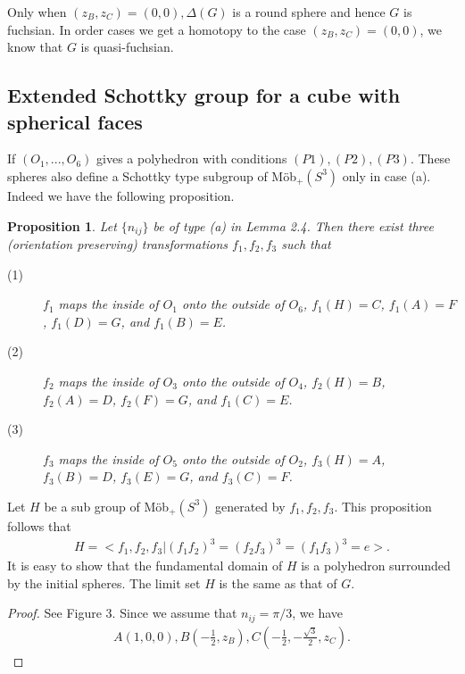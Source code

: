 \documentclass[dvipdfmx]{interact}
\theoremstyle{plain}%
\newtheorem{proposition}[theorem]{Proposition}
\theoremstyle{definition}
\theoremstyle{remark}
\theoremstyle{problemstyle}
\begin{document}
Only when $(z_B, z_C) =(0, 0), \Delta(G)$ is a round sphere and hence
$G$ is fuchsian. In order cases we get a homotopy to the case 
$(z_B, z_C) = (0, 0)$, we know that $G$ is quasi-fuchsian.

\subsection{Extended Schottky group for a cube with spherical faces}\label{extend}
If $(O_1, ..., O_6)$ gives a polyhedron with conditions
$(P1), (P2), (P3)$.
These spheres also define a Schottky type subgroup of M\"ob$_+(S^3)$ 
only in case (a). Indeed we have the following  proposition.

\begin{proposition}
Let $\{n_{ij}\}$ be of type (a) in Lemma 2.4. Then there exist three
 (orientation preserving) transformations $f_1, f_2, f_3$ such that
 \begin{description}
  \item[(1)] $f_1$ maps the inside of $O_1$ onto the outside of
             $O_6$, $f_1(H) = C$, $f_1(A) = F$,  $f_1(D) = G$, and
             $f_1(B) = E$.
  \item[(2)] $f_2$ maps the inside of $O_3$ onto the outside of
             $O_4$, $f_2(H) = B$, $f_2(A) = D$,  $f_2(F) = G$, and
             $f_1(C) = E$.             
  \item[(3)] $f_3$ maps the inside of $O_5$ onto the outside of
             $O_2$, $f_3(H) = A$, $f_3(B) = D$,  $f_3(E) = G$, and
             $f_3(C) = F$.
\end{description}
\end{proposition}

Let $H$ be a sub group of M\"ob$_+(S^3)$ generated by $f_1, f_2,
f_3$. This proposition follows that
\begin{align*}
 H = <f_1, f_2, f_3|(f_1f_2)^3 = (f_2f_3)^3 = (f_1f_3)^3 = e>.
\end{align*}
It is easy to show that the fundamental domain of $H$ is a polyhedron
surrounded by the initial spheres. The limit set $H$ is the same as that
of $G$.

\begin{proof}
See Figure 3. Since we assume that $n_{ij} = \pi/3$, we have
\begin{align*}
 A(1, 0, 0), B(-\frac{1}{2}, z_B), C(-\frac{1}{2}, -\frac{\sqrt{3}}{2}, z_C).
\end{align*}
\end{proof}
\end{document}

